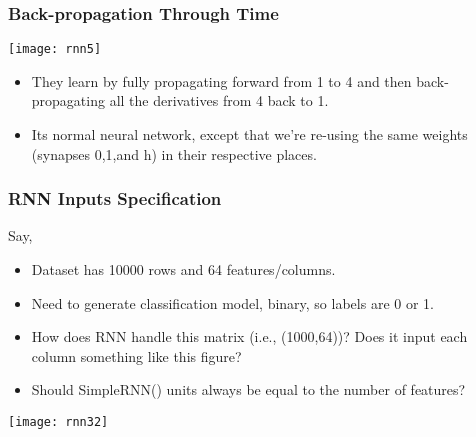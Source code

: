 \begin{frame}[fragile] \frametitle{Back-propagation Through Time}
\begin{center}
\texttt{[image: rnn5]}
\end{center}
\begin{itemize}
\item They learn by fully propagating forward from 1 to 4 and then back-propagating all the derivatives from 4 back to 1. 
\item Its normal neural network, except that we're re-using the same weights (synapses 0,1,and h) in their respective places. 
\end{itemize}
\end{frame}





\begin{frame}[fragile] \frametitle{RNN Inputs Specification}
Say,
\begin{itemize}
\item Dataset has 10000 rows and 64 features/columns.
\item Need to generate classification model, binary, so labels are 0 or 1.
\item How does RNN handle this matrix (i.e., (1000,64))? Does it input each column something like this figure?
\item Should SimpleRNN() units always be equal to the number of features?
\end{itemize}

\begin{center}
\texttt{[image: rnn32]}
\end{center}


\end{frame}

